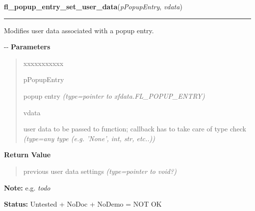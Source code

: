 \hspace{.8\funcindent}\begin{boxedminipage}{\funcwidth}

    \raggedright \textbf{fl\_popup\_entry\_set\_user\_data}(\textit{pPopupEntry}, \textit{vdata})

    \vspace{-1.5ex}

    \rule{\textwidth}{0.5\fboxrule}
\setlength{\parskip}{2ex}

Modifies user data associated with a popup entry.

-{}-
\setlength{\parskip}{1ex}
      \textbf{Parameters}
      \vspace{-1ex}

      \begin{quote}
        \begin{Ventry}{xxxxxxxxxxx}

          \item[pPopupEntry]


popup entry
            {\it (type=pointer to xfdata.FL\_POPUP\_ENTRY)}

          \item[vdata]


user data to be passed to function; callback has to take care of
type check
            {\it (type=any type (e.g. 'None', int, str, etc..))}

        \end{Ventry}

      \end{quote}

      \textbf{Return Value}
    \vspace{-1ex}

      \begin{quote}

previous user data settings
      {\it (type=pointer to void?)}

      \end{quote}

\textbf{Note:} 
e.g. \emph{todo}


\textbf{Status:} 
Untested + NoDoc + NoDemo = NOT OK


    \end{boxedminipage}

    \label{xformslib:flpopup:fl_popup_entry_get_by_position}

